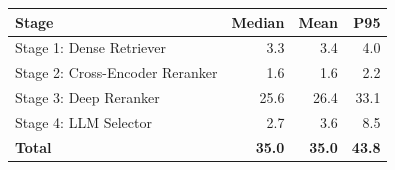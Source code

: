 \begin{tabular}{lrrr}
  \toprule
  \textbf{Stage} & \textbf{Median} & \textbf{Mean} & \textbf{P95} \\
  \midrule
  Stage 1: Dense Retriever        & 3.3 & 3.4 & 4.0 \\
  Stage 2: Cross-Encoder Reranker & 1.6 & 1.6 & 2.2 \\
  Stage 3: Deep Reranker          & 25.6 & 26.4 & 33.1 \\
  Stage 4: LLM Selector           & 2.7 & 3.6 & 8.5 \\
  \midrule
  \textbf{Total}                  & \textbf{35.0} & \textbf{35.0} & \textbf{43.8} \\
  \bottomrule
\end{tabular}

